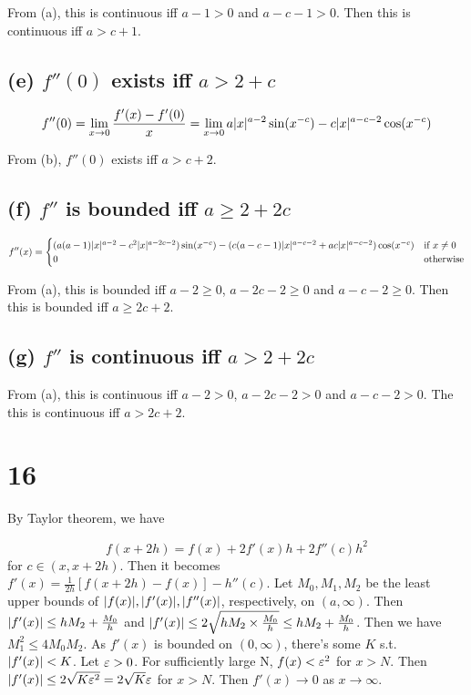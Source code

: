 \documentclass{article}
\begin{document}
From (a), this is continuous iff $a-1 > 0$ and $a-c-1 > 0$. Then this is continuous iff $a > c+1$.

\subsection*{(e) $f''(0)$ exists iff $a > 2+c$}

\[
f''(0) = \lim_{x \to 0} \frac{f'(x)-f'(0)}{x} = \lim_{x \to 0} a\lvert x\rvert^{a-2} \sin(x^{-c}) - c \lvert x\rvert^{a-c-2} \cos(x^{-c})
\]

From (b), $f''(0)$ exists iff $a>c+2$.

\subsection*{(f) $f''$ is bounded iff $a \geq 2+2c$}

\[f''(x)=
\begin{cases}
(a(a-1)\lvert x\rvert^{a-2}-c^2\lvert x\rvert^{a-2c-2}) \sin(x^{-c}) - (c(a-c-1) \lvert x\rvert^{a-c-2}+ac \lvert x\rvert^{a-c-2}) \cos(x^{-c}) & \text{if } x \neq 0 \\
0 & \text{otherwise}
\end{cases}
\]

From (a), this is bounded iff $a-2 \geq 0$, $a-2c-2 \geq 0$ and $a-c-2 \geq 0$. Then this is bounded iff $a \geq 2c+2$.

\subsection*{(g) $f''$ is continuous iff $a > 2+2c$}

From (a), this is continuous iff $a-2 > 0$, $a-2c-2 > 0$ and $a-c-2 > 0$. The this is continuous iff $a > 2c+2$.

\section*{16}

By Taylor theorem, we have 

\[f(x+2h)=f(x)+2f'(x)h+2f''(c)h^2\] for $c \in (x,x+2h)$. Then it becomes $f'(x)=\frac{1}{2h}[f(x+2h)-f(x)]-h''(c)$. Let $M_0, M_1, M_2$ be the least upper bounds of $\lvert f(x)\rvert, \lvert f'(x)\rvert, \lvert f''(x)\rvert$, respectively, on $(a,\infty)$. Then $\lvert f'(x)\rvert \leq hM_2 + \frac{M_0}{h}$ and $\lvert f'(x)\rvert \leq 2\sqrt{hM_2 \times \frac{M_0}{h}} \leq hM_2 + \frac{M_0}{h}$. Then we have $M_1^2 \leq 4M_0 M_2$. As $f'(x)$ is bounded on $(0,\infty)$, there's some $K$ s.t. $\lvert f'(x)\rvert < K$. Let $\varepsilon > 0$. For sufficiently large N, $f(x) < \varepsilon^2$ for $x > N$. Then $\lvert f'(x)\rvert \leq 2\sqrt{K\varepsilon^2} = 2\sqrt{K}\varepsilon$ for $x > N$. Then $f'(x) \to 0$ as $x \to \infty$.
\end{document}
